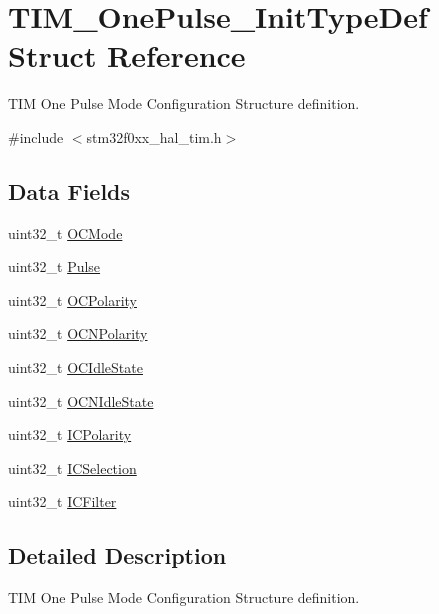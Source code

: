 \hypertarget{struct_t_i_m___one_pulse___init_type_def}{}\section{T\+I\+M\+\_\+\+One\+Pulse\+\_\+\+Init\+Type\+Def Struct Reference}
\label{struct_t_i_m___one_pulse___init_type_def}


T\+IM One Pulse Mode Configuration Structure definition.  




{\ttfamily \#include $<$stm32f0xx\+\_\+hal\+\_\+tim.\+h$>$}

\subsection*{Data Fields}
\begin{DoxyCompactItemize}
\item 
uint32\+\_\+t \hyperlink{struct_t_i_m___one_pulse___init_type_def_add4ac9143086c89effbede5c54e958bf}{O\+C\+Mode}
\item 
uint32\+\_\+t \hyperlink{struct_t_i_m___one_pulse___init_type_def_a5251c3bce4ca5baf013bc0ace0865a4c}{Pulse}
\item 
uint32\+\_\+t \hyperlink{struct_t_i_m___one_pulse___init_type_def_a781c7dae9dec8b6c974b1bdf591b77e7}{O\+C\+Polarity}
\item 
uint32\+\_\+t \hyperlink{struct_t_i_m___one_pulse___init_type_def_a978da9dd7cda80eb5fe8d04828b9bbcc}{O\+C\+N\+Polarity}
\item 
uint32\+\_\+t \hyperlink{struct_t_i_m___one_pulse___init_type_def_a57bb589da3cf2b39b727fe4a3d334ab3}{O\+C\+Idle\+State}
\item 
uint32\+\_\+t \hyperlink{struct_t_i_m___one_pulse___init_type_def_a78d21970d78c1e3e328692743406ba25}{O\+C\+N\+Idle\+State}
\item 
uint32\+\_\+t \hyperlink{struct_t_i_m___one_pulse___init_type_def_a6c0364c24e89f17849b0109236112fba}{I\+C\+Polarity}
\item 
uint32\+\_\+t \hyperlink{struct_t_i_m___one_pulse___init_type_def_a280cec08ad0ea4608ae57523775cc1c0}{I\+C\+Selection}
\item 
uint32\+\_\+t \hyperlink{struct_t_i_m___one_pulse___init_type_def_ab621c1517d5345834fcc71eea97156bf}{I\+C\+Filter}
\end{DoxyCompactItemize}


\subsection{Detailed Description}
T\+IM One Pulse Mode Configuration Structure definition. 

